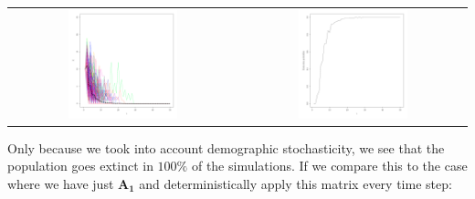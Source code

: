 \documentclass{article}\usepackage[]{graphicx}\usepackage[]{color}
\begin{document}
\begin{center}
\begin{tabular}{c c}

\includegraphics[width=0.5\textwidth]{figure/dice10-1} 
 & 
\includegraphics[width=0.5\textwidth]{figure/dice10-2} 

\end{tabular}
\end{center}
Only because we took into account demographic stochasticity, we see that the population goes extinct in $100\%$ of the simulations. If we compare this to the case where we have just $\boldsymbol{A_1}$ and deterministically apply this matrix every time step:
\end{document}
